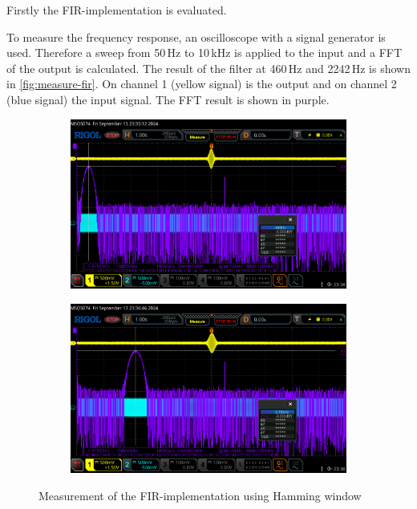 Firstly the \ac{FIR}-implementation is evaluated.

To measure the frequency response, an oscilloscope with a signal generator is used. Therefore a sweep
from 50\,Hz to 10\,kHz is applied to the input and a \ac{FFT} of the output is calculated. The result
of the filter at 460\,Hz and 2242\,Hz is shown in \autoref{fig:measure-fir}. On channel 1 (yellow signal)
is the output and on channel 2 (blue signal) the input signal. The \ac{FFT} result is shown in purple.

\begin{figure}[!h]
    \centering
    \begin{subfigure}[c]{0.49\textwidth}
        \centering
        \includegraphics[width=\textwidth]{img/fir_measure_460_hamming.png}
    \end{subfigure}
    \begin{subfigure}[c]{0.49\textwidth}
        \centering
        \includegraphics[width=\textwidth]{img/fir_measure_2242_hamming.png}
    \end{subfigure}
    \caption{Measurement of the \ac{FIR}-implementation using Hamming window}
    \label{fig:measure-fir}
\end{figure}

